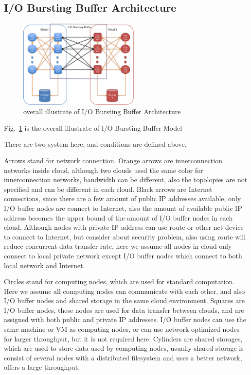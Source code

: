 \documentclass[JIP,draft]{ipsj}
\begin{document}
\subsection{I/O Bursting Buffer Architecture}

\begin{figure}[tb]
	\centering
	\includegraphics[width=6cm]{overview}
	\caption{overall illustrate of I/O Bursting Buffer Architecture}
	\label{overview}
\end{figure}

Fig.~\ref{overview} is the overall illustrate of I/O Bursting Buffer Model

There are two system here, and conditions are defined above.

Arrows stand for network connection.
Orange arrows are innerconnection networks inside cloud, although two clouds used the same color for innerconnection networks, bandwidth can be different, also the topolopies are not specified and can be different in each cloud.
Black arrows are Internet connections, since there are a few amount of public IP addresses available, only I/O buffer nodes are connect to Internet, also the amount of available public IP address becomes the upper bound of the amount of I/O buffer nodes in each cloud. 
Although nodes with private IP address can use route or other net device to connect to Internet, but consider about security problem, also using route will reduce concurrent data transfer rate, here we assume all nodes in cloud only connect to local private network except I/O buffer nodes which connect to both local network and Internet.

Circles stand for computing nodes, which are used for standard computation.
Here we assume all computing nodes can communicate with each other, and also I/O buffer nodes and shared storage in the same cloud environment.
Squares are I/O buffer nodes, these nodes are used for data transfer between clouds, and are assigned with both public and private IP addresses.
I/O buffer nodes can use the same machine or VM as computing nodes, or can use network optimized nodes for larger throughput, but it is not required here.
Cylinders are shared storages, which are used to store data used by computing nodes, usually shared storage is consist of several nodes with a distributed filesystem and uses a better network, offers a large throughput.
\end{document}
